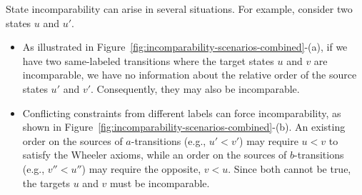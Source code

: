 \begin{example}
    State incomparability can arise in several situations. For example, consider two states $u$ and $u'$.
    \begin{itemize}
        \item As illustrated in Figure~\ref{fig:incomparability-scenarios-combined}-(a), if we have two same-labeled transitions where the target states $u$ and $v$ are incomparable, we have no information about the relative order of the source states $u'$ and $v'$. Consequently, they may also be incomparable.
        \item Conflicting constraints from different labels can force incomparability, as shown in Figure~\ref{fig:incomparability-scenarios-combined}-(b). An existing order on the sources of $a$-transitions (e.g., $u' < v'$) may require $u < v$ to satisfy the Wheeler axioms, while an order on the sources of $b$-transitions (e.g., $v'' < u''$) may require the opposite, $v < u$. Since both cannot be true, the targets $u$ and $v$ must be incomparable.
    \end{itemize}

    \begin{figure}[H]
    \centering
    \begin{subfigure}[b]{0.4\textwidth}
        \centering
        \caption{}
        \label{fig:incomparability-scenario1}
    \end{subfigure}
    \hfill
    \begin{subfigure}[b]{0.55\textwidth}
        \centering
\end{subfigure}
\end{figure}
\end{example}
